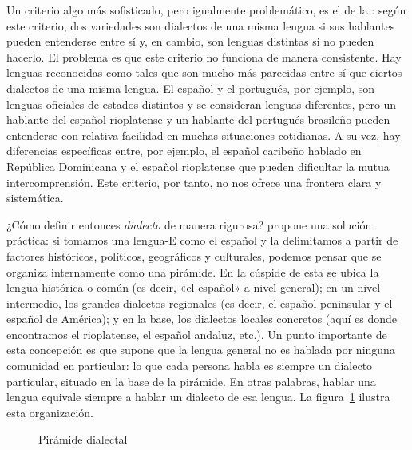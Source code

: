 Un criterio algo más sofisticado, pero igualmente problemático, es el de la
: según este criterio, dos variedades son dialectos de
una misma lengua si sus hablantes pueden entenderse entre sí y, en cambio, son
lenguas distintas si no pueden hacerlo. El problema es que este criterio no
funciona de manera consistente. Hay lenguas reconocidas como tales que son mucho
más parecidas entre sí que ciertos dialectos de una misma lengua. El español y el
portugués, por ejemplo, son lenguas oficiales de estados distintos y se
consideran lenguas diferentes, pero un hablante del español rioplatense y un
hablante del portugués brasileño pueden entenderse con relativa facilidad en
muchas situaciones cotidianas. A su vez, hay diferencias específicas entre, por
ejemplo, el español caribeño hablado en República Dominicana y el español
rioplatense que pueden dificultar la mutua intercomprensión. Este criterio, por
tanto, no nos ofrece una frontera clara y sistemática.

¿Cómo definir entonces \textit{dialecto} de manera rigurosa?
\textcite{silvacorvalan2001} propone una solución práctica: si tomamos una
lengua-E como el español y la delimitamos a partir de factores históricos,
políticos, geográficos y culturales, podemos pensar que se organiza internamente
como una pirámide. En la cúspide de esta  se ubica la
lengua histórica o común (es decir, «el español» a nivel general); en un nivel
intermedio, los grandes dialectos regionales (es decir, el español peninsular y
el español de América); y en la base, los dialectos locales concretos (aquí es
donde encontramos el rioplatense, el español andaluz, etc.). Un punto importante
de esta concepción es que supone que la lengua general no es hablada por ninguna
comunidad en particular: lo que cada persona habla es siempre un dialecto
particular, situado en la base de la pirámide. En otras palabras, hablar una
lengua equivale siempre a hablar un dialecto de esa lengua. La
figura~\ref{fig:15-piramide} ilustra esta organización.

\begin{figure}[htbp]
  \centering
  \caption{Pirámide dialectal \parencite[adaptado de][14]{silvacorvalan2001}}\label{fig:15-piramide}
\end{figure}

